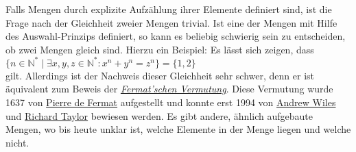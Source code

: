 Falls Mengen durch explizite Aufz\"{a}hlung ihrer Elemente definiert sind, ist die Frage nach
der Gleichheit zweier Mengen trivial.  Ist eine der Mengen mit Hilfe des Auswahl-Prinzips definiert, so
kann es beliebig schwierig sein zu entscheiden, ob zwei Mengen gleich sind.  Hierzu ein
Beispiel:  Es l\"{a}sst sich zeigen, dass \\[0.2cm]
\hspace*{1.3cm} 
$\{ n \in \mathbb{N}^* \mid \exists x, y, z\in\mathbb{N}^*: x^n + y^n = z^n \} = \{1,2\}$ \\[0.2cm]
gilt.  Allerdings ist der Nachweis dieser Gleichheit sehr schwer, denn er ist \"{a}quivalent
zum Beweis der 
\href{https://en.wikipedia.org/wiki/Fermat%27s_Last_Theorem}{\emph{Fermat'schen Vermutung}}. Diese
Vermutung wurde 1637 von \href{https://de.wikipedia.org/wiki/Pierre_de_Fermat}{Pierre de Fermat}
aufgestellt und konnte erst 1994 von \href{https://de.wikipedia.org/wiki/Andrew_Wiles}{Andrew Wiles}
und \href{https://de.wikipedia.org/wiki/Richard_Taylor_(Mathematiker)}{Richard Taylor} bewiesen werden. 
Es gibt andere, \"{a}hnlich aufgebaute Mengen, wo bis heute unklar ist, welche Elemente in der
Menge liegen und welche nicht.


